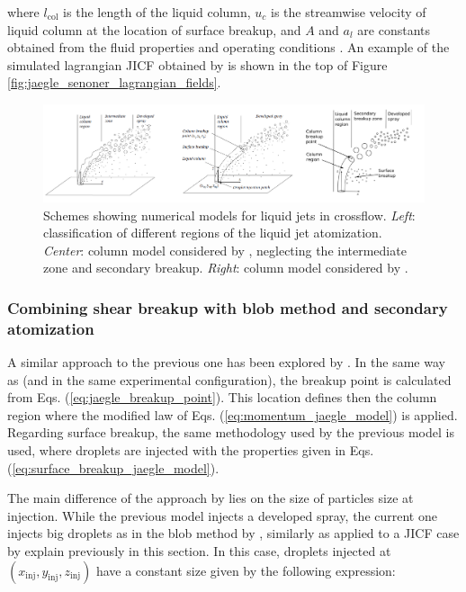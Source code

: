 where $l_\mathrm{col}$ is the length of the liquid column, $u_c$ is the streamwise velocity of liquid column at the location of surface breakup, and $A$ and $a_l$ are constants obtained from the fluid properties and operating conditions . An example of the simulated lagrangian JICF obtained by  is shown in the top of Figure \ref{fig:jaegle_senoner_lagrangian_fields}.

\begin{figure}[ht]
    \centering
    \includegraphics[width=1.0\textwidth]{./part1_numerical_approaches/figures_ch3/jaegle_senoner_modeling_strategies}
       \centering
    \caption[Schemes showing numerical models for liquid jets in crossflow]{Schemes showing numerical models for liquid jets in crossflow. \textsl{Left}: classification of different regions of the liquid jet atomization. \textsl{Center}:  column model considered by , neglecting the intermediate zone and secondary breakup. \textsl{Right}: column model considered by  .}
    \label{fig:jaegle_senoner_modeling_strategies}
\end{figure}

\subsubsection*{Combining shear breakup with blob method and secondary atomization }

A similar approach to the previous one has been explored by . In the same way as  (and in the same experimental configuration), the breakup point is calculated from Eqs. (\ref{eq:jaegle_breakup_point}). This location defines then the column region where the modified law of Eqs. (\ref{eq:momentum_jaegle_model}) is applied. Regarding surface breakup, the same methodology used by the previous model is used, where droplets are injected with the properties given in Eqs. (\ref{eq:surface_breakup_jaegle_model}).

The main difference of the approach by  lies on the size of particles size at injection. While the previous model injects a developed spray, the current one injects big droplets as in the blob method by , similarly as applied to a JICF case by  explain previously in this section. In this case, droplets injected at $\left( x_\mathrm{inj}, y_\mathrm{inj}, z_\mathrm{inj} \right)$ have a constant size given by the following expression:

